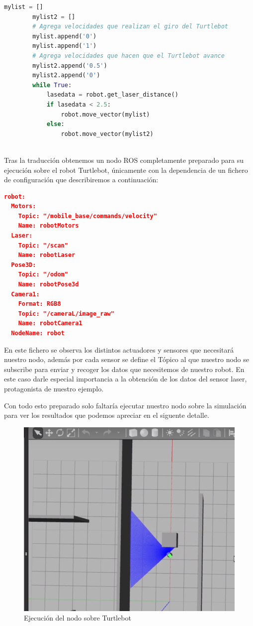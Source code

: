\begin{lstlisting}[language=python,firstnumber=1]
        mylist = []
        mylist2 = []
		# Agrega velocidades que realizan el giro del Turtlebot
        mylist.append('0')
        mylist.append('1')
        # Agrega velocidades que hacen que el Turtlebot avance
        mylist2.append('0.5')
        mylist2.append('0')
        while True:
            lasedata = robot.get_laser_distance()
            if lasedata < 2.5:
                robot.move_vector(mylist)
            else:
                robot.move_vector(mylist2)
                
\end{lstlisting}
\pagebreak
Tras la traducción obtenemos un nodo ROS completamente preparado para su ejecución sobre el robot Turtlebot, únicamente con la dependencia de un fichero de configuración que describiremos a continuación:
\begin{lstlisting}[language=json,firstnumber=1]
robot:
  Motors:
    Topic: "/mobile_base/commands/velocity"
    Name: robotMotors
  Laser:
    Topic: "/scan"
    Name: robotLaser
  Pose3D:
    Topic: "/odom"
    Name: robotPose3d
  Camera1:
    Format: RGB8
    Topic: "/cameraL/image_raw"
    Name: robotCamera1
  NodeName: robot
\end{lstlisting}
En este fichero se observa los distintos actuadores y sensores que necesitará nuestro nodo, además por cada sensor se define el Tópico al que nuestro nodo se subscribe para enviar y recoger los datos que necesitemos de nuestro robot. En este caso darle especial importancia a la obtención de los datos del sensor laser, protagonista de nuestro ejemplo.

Con todo esto preparado solo faltaría ejecutar nuestro nodo sobre la simulación para ver los resultados que podemos apreciar en el siguente detalle.

\begin{figure}[H]
    \centering
    \includegraphics[scale=0.75]{img/robot-example.PNG}
  	\caption{Ejecución del nodo sobre Turtlebot}
  	\label{fig:turtlebot}
\end{figure}


